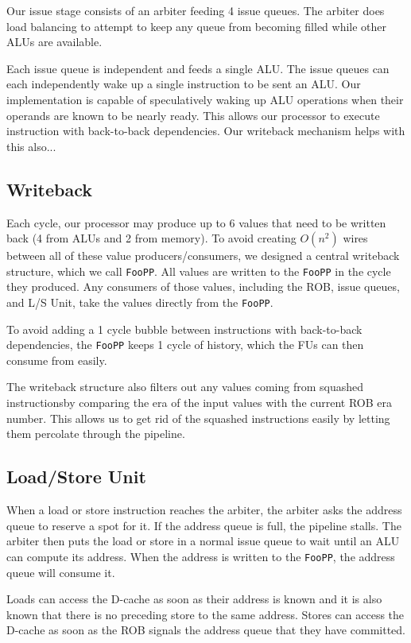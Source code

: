 \documentclass{article}
\begin{document}
Our issue stage consists of an arbiter feeding 4 issue queues.
The arbiter does load balancing to attempt to keep any queue from becoming
filled while other ALUs are available.

Each issue queue is independent and feeds a single ALU. The issue queues can
each independently wake up a single instruction to be sent an ALU. Our
implementation is capable of speculatively waking up ALU operations when their
operands are known to be nearly ready. This allows our processor to execute
instruction with back-to-back dependencies. Our writeback mechanism helps with
this also...

\subsection{Writeback}

Each cycle, our processor may produce up to 6 values that need to be written
back (4 from ALUs and 2 from memory). To avoid creating $O(n^2)$ wires between
all of these value producers/consumers, we designed a central writeback
structure, which we call \texttt{FooPP}. All values are written to the
\texttt{FooPP} in the cycle they produced. Any consumers of those values,
including the ROB, issue queues, and L/S Unit, take the values directly from the
\texttt{FooPP}.

To avoid adding a 1 cycle bubble between instructions with back-to-back
dependencies, the \texttt{FooPP} keeps 1 cycle of history, which the FUs can
then consume from easily.

The writeback structure also filters out any values coming from squashed
instructionsby comparing the era of the input values with the current ROB era
number. This allows us to get rid of the squashed instructions easily by letting
them percolate through the pipeline.

\subsection{Load/Store Unit}

When a load or store instruction reaches the arbiter, the arbiter asks the
address queue to reserve a spot for it. If the address queue is full, the
pipeline stalls. The arbiter then puts the load or store in a normal issue queue
to wait until an ALU can compute its address. When the address is written to the
\texttt{FooPP}, the address queue will consume it.

Loads can access the D-cache as soon as their address is known and it is also
known that there is no preceding store to the same address. Stores can access
the D-cache as soon as the ROB signals the address queue that they have
committed.
\end{document}
